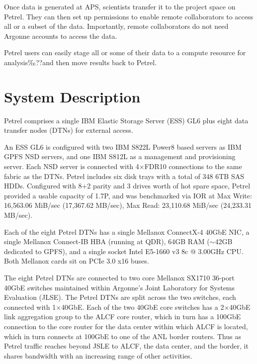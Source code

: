 \documentclass[sigconf]{acmart}
\begin{document}
Once data is generated at APS, scientists transfer it to the project space on Petrel. They can then set up permissions to enable remote collaborators to access all or a subset of the data. Importantly, remote collaborators do not need Argonne accounts to access the data.

Petrel users can easily stage all or some of their data to a compute resource for analysis‰??and then move results back to Petrel.


\section{System Description}

Petrel comprises a single IBM Elastic Storage Server (ESS) GL6 plus eight data transfer nodes (DTNs) for external access.

An ESS GL6 is configured with two IBM S822L Power8 based servers as IBM GPFS NSD servers, and one IBM S812L as a management and provisioning server. 
Each NSD server is connected with 4$\times$FDR10 connections to the same fabric as the DTNs. 
Petrel includes six disk trays with a total of 348 6TB SAS HDDs. 
Configured with 8+2 parity and 3 drives worth of hot spare space, Petrel provided a usable capacity of 1.7P, and was benchmarked via IOR at Max Write: 16,563.06 MiB/sec (17,367.62 MB/sec), Max Read:  23,110.68 MiB/sec (24,233.31 MB/sec).

Each of the eight Petrel DTNs has a single Mellanox ConnectX-4 40GbE NIC, a single Mellanox Connect-IB HBA (running at QDR), 64GB RAM ($\sim$42GB dedicated to GPFS), and a single socket Intel E5-1660 v3 8c @ 3.00GHz CPU. 
Both Mellanox cards sit on PCIe 3.0 x16 buses.

The eight Petrel DTNs are connected to two core Mellanox SX1710 36-port 40GbE switches
maintained within Argonne's Joint Laboratory for Systems Evaluation (JLSE).
The Petrel DTNs are split across the two switches, each connected with 1$\times$40GbE. 
Each of the two 40GbE core switches has a 2$\times$40GbE link aggregation group to the ALCF core router, which in turn has a 100GbE connection to the core router for the data center within
which ALCF is located,
which in turn connects at 100GbE to one of the ANL border routers.
Thus as Petrel traffic reaches beyond JSLE to ALCF, the data center, and the border,
it shares bandwidth with an increasing range of other activities.
\end{document}
